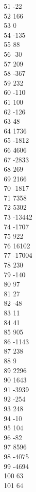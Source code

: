 { 51	-22 \\
 52	166 \\
 53	0 \\
 54	-135 \\
 55	88 \\
 56	-30 \\
 57	209 \\
 58	-367 \\
 59	232 \\
 60	-110 \\
 61	100 \\
 62	-126 \\
 63	48 \\
 64	1736 \\
 65	-1812 \\
 66	4606 \\
 67	-2833 \\
 68	269 \\
 69	2166 \\
 70	-1817 \\
 71	7358 \\
 72	5302 \\
 73	-13442 \\
 74	-1707 \\
 75	922 \\
 76	16102 \\
 77	-17004 \\
 78	230 \\
 79	-140 \\
 80	97 \\
 81	27 \\
 82	-48 \\
 83	11 \\
 84	41 \\
 85	905 \\
 86	-1143 \\
 87	238 \\
 88	9 \\
 89	2296 \\
 90	1643 \\
 91	-3939 \\
 92	-254 \\
 93	248 \\
 94	-10 \\
 95	104 \\
 96	-82 \\
 97	8596 \\
 98	-4075 \\
 99	-4694 \\
 100	63 \\
 101	64 \\
}
